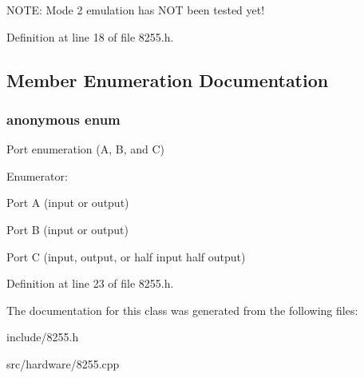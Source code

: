 N\-O\-T\-E\-: Mode 2 emulation has N\-O\-T been tested yet! 

Definition at line 18 of file 8255.\-h.



\subsection{Member Enumeration Documentation}
\hypertarget{classIntel8255_afad1dcdd07864ccadd09c33e1af473ed}{\subsubsection[{anonymous enum}]{\setlength{\rightskip}{0pt plus 5cm}anonymous enum}}\label{classIntel8255_afad1dcdd07864ccadd09c33e1af473ed}
Port enumeration (A, B, and C) \begin{Desc}
\item[Enumerator\-: ]\par
\begin{description}
\item[{\em 
\hypertarget{classIntel8255_afad1dcdd07864ccadd09c33e1af473eda37629392c4361095a45143d6093e0a71}{Port\-A}\label{classIntel8255_afad1dcdd07864ccadd09c33e1af473eda37629392c4361095a45143d6093e0a71}
}]Port A (input or output) \item[{\em 
\hypertarget{classIntel8255_afad1dcdd07864ccadd09c33e1af473eda480265dca14f2d4b03d6d0f6e9ae66f3}{Port\-B}\label{classIntel8255_afad1dcdd07864ccadd09c33e1af473eda480265dca14f2d4b03d6d0f6e9ae66f3}
}]Port B (input or output) \item[{\em 
\hypertarget{classIntel8255_afad1dcdd07864ccadd09c33e1af473edac42dfe5b4e1996f66b828cb26b79fb95}{Port\-C}\label{classIntel8255_afad1dcdd07864ccadd09c33e1af473edac42dfe5b4e1996f66b828cb26b79fb95}
}]Port C (input, output, or half input half output) \end{description}
\end{Desc}



Definition at line 23 of file 8255.\-h.



The documentation for this class was generated from the following files\-:\begin{DoxyCompactItemize}
\item 
include/8255.\-h\item 
src/hardware/8255.\-cpp\end{DoxyCompactItemize}
